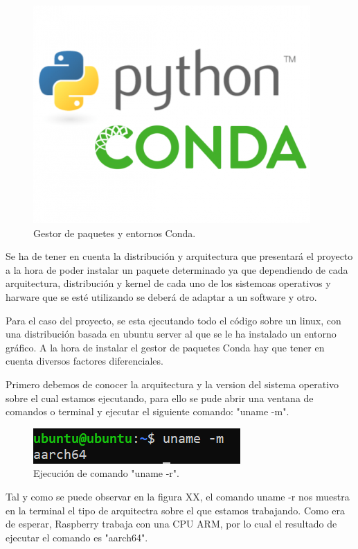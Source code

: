\begin{figure}[h]
    \centering
    \includegraphics[scale=0.5]{fig/python-conda.png}
    \caption{Gestor de paquetes y entornos Conda.}
    \label{fig:mesh1}
\end{figure}

Se ha de tener en cuenta la distribución y arquitectura que presentará el proyecto a la hora de poder instalar un paquete determinado ya que dependiendo de cada arquitectura, distribución y kernel de cada uno de los sistemoas operativos y harware que se esté utilizando se deberá de adaptar a un software y otro.

Para el caso del proyecto, se esta ejecutando todo el código sobre un linux, con una distribución basada en ubuntu server al que se le ha instalado un entorno gráfico. A la hora de instalar el gestor de paquetes Conda hay que tener en cuenta diversos factores diferenciales.

Primero debemos de conocer la arquitectura y la version del sistema operativo sobre el cual estamos ejecutando, para ello se pude abrir una ventana de comandos o terminal y ejecutar el siguiente comando: "uname -m".

\begin{figure}[h]
    \centering
    \includegraphics[scale=1.5]{fig/uname -r.PNG}
    \caption{Ejecución de comando "uname -r".}
    \label{fig:mesh1}
\end{figure}

Tal y como se puede observar en la figura XX, el comando uname -r nos muestra en la terminal el tipo de arquitectra sobre el que estamos trabajando. Como era de esperar, Raspberry trabaja con una CPU ARM, por lo cual el resultado de ejecutar el comando es "aarch64".

